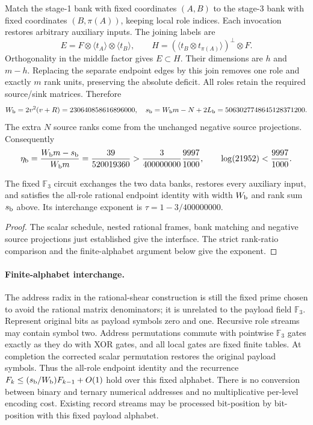Match the stage-1 bank with fixed coordinates $(A,B)$ to the stage-3 bank
with fixed coordinates $(B,\pi(A))$, keeping local role indices. Each
invocation restores arbitrary auxiliary inputs. The joining labels are
\[
 E=F\otimes\langle t_A\rangle\otimes\langle t_B\rangle,
 \qquad H=(\langle t_B\otimes t_{\pi(A)}\rangle)^\perp\otimes F.
\]
Orthogonality in the middle factor gives $E\subset H$. Their dimensions
are $h$ and $m-h$. Replacing the separate endpoint edges by this join
removes one role and exactly $m$ rank units, preserving the absolute deficit.
All roles retain the required source/sink matrices. Therefore
\[
 W_{\rm b}=2v^2(v+R)=230640858616896000,
 \quad s_{\rm b}=W_{\rm b}m-N+2L_{\rm b}
 =5063027748645128371200.
\]
The extra $N$ source ranks come from the unchanged negative source projections.
Consequently
\[
 \eta_{\rm b}=\frac{W_{\rm b}m-s_{\rm b}}{W_{\rm b}m}
 =\frac{39}{520019360}>
 \frac3{400000000}\frac{9997}{1000},
 \qquad \log(21952)<\frac{9997}{1000}.
\]
\begin{proposition}\label{prop:prime-field-bit-interface}
The fixed $\mathbb F_3$ circuit exchanges the two data banks, restores every
auxiliary input, and satisfies the all-role rational endpoint identity with
width $W_{\rm b}$ and rank sum $s_{\rm b}$ above. Its interchange exponent is
$\tau=1-3/400000000$.
\end{proposition}
\begin{proof}
The scalar schedule, nested rational frames, bank matching and negative
source projections just established give the interface. The strict
rank-ratio comparison and the finite-alphabet argument below give the exponent.
\end{proof}

\paragraph{Finite-alphabet interchange.}
The address radix in the rational-shear construction is still the fixed
prime chosen to avoid the rational matrix denominators; it is unrelated to
the payload field $\mathbb F_3$. Represent original bits as payload symbols
zero and one. Recursive role streams may contain symbol two. Address
permutations commute with pointwise $\mathbb F_3$ gates exactly as they do
with XOR gates, and all local gates are fixed finite tables. At completion
the corrected scalar permutation restores the original payload symbols.
Thus the all-role endpoint identity and the recurrence
$F_k\le(s_{\rm b}/W_{\rm b})F_{k-1}+O(1)$ hold over this fixed alphabet.
There is no conversion between binary and ternary numerical addresses and
no multiplicative per-level encoding cost. Existing record streams may be
processed bit-position by bit-position with this fixed payload alphabet.

